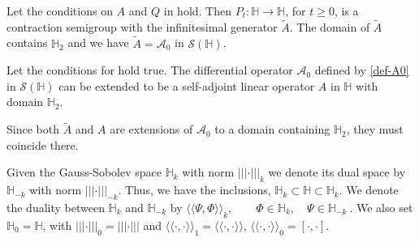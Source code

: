 \documentclass[review,onefignum,onetabnum]{siamart190516}
\begin{document}
    \begin{theorem}\label{the-Pt-A}
        Let the conditions on $A$ and $Q$ in  hold.
        Then \sloppy ${P_t: \mathbb{H}\rightarrow \mathbb{H}}$, for $t \ge 0$, 
        is a contraction semigroup with the infinitesimal generator $\tilde{A}$.
        The domain of $\tilde{A}$ contains $\mathbb{H}_{2}$ and we have
        $\tilde{A} =\mathcal{A}_0 $ in $\mathcal{S}(\mathbb{H})$.
    \end{theorem}

    \begin{theorem}\label{the-Pt-A1}
        Let the conditions for  hold true. The differential
        operator $\mathcal{A}_0 $  defined by \eqref{def-A0} in
        $\mathcal{S}(\mathbb{H})$ can be extended to be a self-adjoint
        linear operator $A$ in $\mathbb{H}$ with domain $\mathbb{H}_{2}$.
    \end{theorem}
%
        Since both $\tilde{A}$ and $A$ are extensions of $\mathcal{A}_0 $ to a
    domain containing $\mathbb{H}_{2}$, they must coincide there.

    Given the Gauss-Sobolev space $\mathbb{H}_{k}$ with norm
    $|||\cdot|||_{k} $ we denote its dual space by $\mathbb{H}_{-k}$ with norm
    $|||\cdot|||_{-k}$. Thus, we have the inclusions,
    $
        \mathbb{H}_{k} \subset \mathbb{H} \subset \mathbb{H}_{k}.
    $
    We denote the duality between $ \mathbb{H}_{k}$ and $ \mathbb{H}_{-k}$ by
    $
        \langle
            \langle
                \Psi,\Phi
            \rangle
        \rangle_k,
        \qquad
        \Phi\in\mathbb{H}_{k},
        \quad \Psi\in\mathbb{H}_{-k} \ .
    $
    We also set $\mathbb{H}_{0}= \mathbb{H}$,
    with $|||\cdot|||_{0}= |||\cdot|||$ and
    $
        \langle
            \langle
                \cdot,\cdot
            \rangle
        \rangle_1=
        \langle
            \langle
                \cdot,\cdot
            \rangle
        \rangle
    $,
    $
        \langle
            \langle
                \cdot,\cdot
            \rangle
        \rangle_0 = [\cdot,\cdot]
    $.
\end{document}
